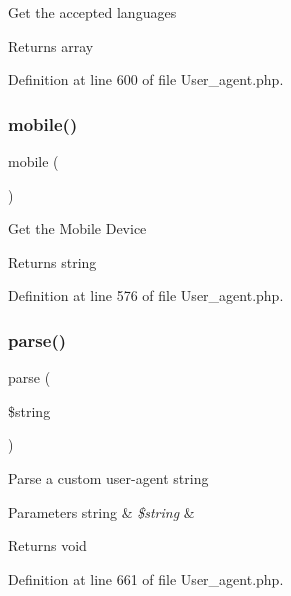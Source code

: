 Get the accepted languages

\begin{DoxyReturn}{Returns}
array 
\end{DoxyReturn}


Definition at line 600 of file User\+\_\+agent.\+php.

\mbox{\label{class_c_i___user__agent_a8e13f70e084cbb413d7b68805f3b09dd}} 
\subsubsection{\texorpdfstring{mobile()}{mobile()}}
{\footnotesize\ttfamily mobile (\begin{DoxyParamCaption}{ }\end{DoxyParamCaption})}

Get the Mobile Device

\begin{DoxyReturn}{Returns}
string 
\end{DoxyReturn}


Definition at line 576 of file User\+\_\+agent.\+php.

\mbox{\label{class_c_i___user__agent_a8652be52c4455b8ce1a8e79fdb083703}} 
\subsubsection{\texorpdfstring{parse()}{parse()}}
{\footnotesize\ttfamily parse (\begin{DoxyParamCaption}\item[{}]{\$string }\end{DoxyParamCaption})}

Parse a custom user-\/agent string


\begin{DoxyParams}[1]{Parameters}
string & {\em \$string} & \\
\hline
\end{DoxyParams}
\begin{DoxyReturn}{Returns}
void 
\end{DoxyReturn}


Definition at line 661 of file User\+\_\+agent.\+php.

